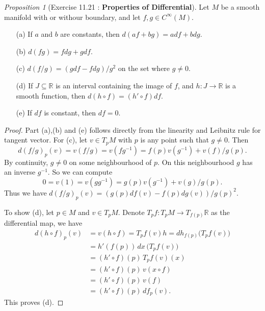\documentclass[a4paper]{article}
\theoremstyle{remark}
\newtheorem{prop}{Proposition}
\newcommand{\er}{\mathbb{R}} %
\newcommand{\subhim}{\subseteq} %
\newcommand{\CM}{C^{\infty}(M)} %
\begin{document}
\begin{prop}[Exercise 11.21 : \textbf{Properties of Differential}]
Let $M$ be a smooth manifold with or withour boundary, and let $f,g \in \CM$.
\begin{enumerate}[nolistsep]
\item[(a)] If $a$ and $b$ are constants, then $d(af+bg) = adf +b dg$.
\item[(b)] $d(fg) = fdg + g df$.
\item[(c)] $d(f/g) = (gdf - fdg)/g^2$ on the set where $g\neq 0$.
\item[(d)] If $J \subhim \er$ is an interval containing the image of $f$, and $h : J \to \er$ is a smooth function, then $d(h \circ f) = (h' \circ f) df$.
\item[(e)] If $df$ is constant, then $df=0$. 
\end{enumerate}
\end{prop}
\begin{proof}
Part (a),(b) and (e) follows directly from the linearity and Leibnitz rule for tangent vector. For (c), let $v \in T_pM$ with $p$ is any point such that $g \neq 0$. Then 
$$
d(f/g)_p(v) = v(f/g) = v(fg^{-1}) = f(p) v(g^{-1}) + v(f)/g(p).
$$
By continuity, $g \neq 0$ on some neighbourhood of $p$. On this neighbourhood $g$ has an inverse $g^{-1}$. So we can compute 
$$
0 = v(1) = v(g g^{-1}) = g(p) v(g^{-1}) + v(g)/g(p).
$$
Thus we have $d(f/g)_p(v) = (g(p) df(v) - f(p) dg(v))/g(p)^2$.

To show (d), let $p \in M$ and $v \in T_pM$. Denote $T_p f : T_pM \to T_{f(p)} \er$ as the differential map, we have 
\begin{align*}
d(h \circ f)_p (v) &= v(h \circ f) = T_pf(v) h = dh_{f(p)} \big(T_pf(v) \big) \\ &= h'(f(p))\, dx \, \big(T_pf(v)\big)\\ &= (h' \circ f)(p)\, T_pf(v) (x) \\ &= (h' \circ f)(p)\, v(x \circ f) \\ &= (h' \circ f)(p)\, v(f) \\ &= (h' \circ f)(p)\, df_p(v).
\end{align*}
This proves (d).
\end{proof}
\end{document}

